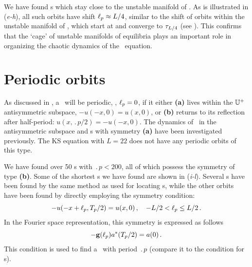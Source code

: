 


We have found \rpo s which stay
close to the unstable manifold of .
As is illustrated in (\textit{e-h}), all such orbits have
shift $\ell_p \approx L/4$, similar to the shift of orbits within
the unstable manifold of , which start at  and
converge to $\tau_{L/4}$ (see ). This
confirms that the `cage' of unstable manifolds of equilibria plays
an important role in organizing the chaotic dynamics of the \KS\
equation.


\section{Periodic orbits} \label{ssec:po}
As discussed in , a \rpo\ will be periodic, \ie,
$\ell_p = 0$, if it either {\bf (a)} lives within the $\mathbb{U}^+$ antisymmetric
subspace, $-u(-x,0) = u(x,0)$, or {\bf (b)} returns to its reflection
after half-period: $u(x,\period{p}/2)=-u(-x,0)$.  The dynamics of
\KSe\ in the antisymmetric subspace and \po s with symmetry {\bf (a)} have
been investigated
previously. The KS equation
with $L = 22$ does not have any periodic orbits of this type.


We have found over 50 \po s with $\period{p} < 200$, 
all of which possess the symmetry
of type {\bf (b)}. %
Some of the shortest \po s we have found are shown in
(\textit{i-l}).  Several \po s have been found by the same
method as used for locating \rpo s, while the other orbits have been
found by directly employing the symmetry condition:
\[ -u(-x+\ell_p,{T_{p}}/2) = u(x,0)\,, \quad -L/2 < \ell_p \leq L/2\,.\]
In the Fourier space representation, this symmetry is expressed as
follows
\[ -\mathbf{g}(\ell_p)a^\ast({T_{p}}/2) = a(0)\,. \]
This condition is used to find a \po\ with period $\period{p}$
(compare it to the condition  for \rpo s).


